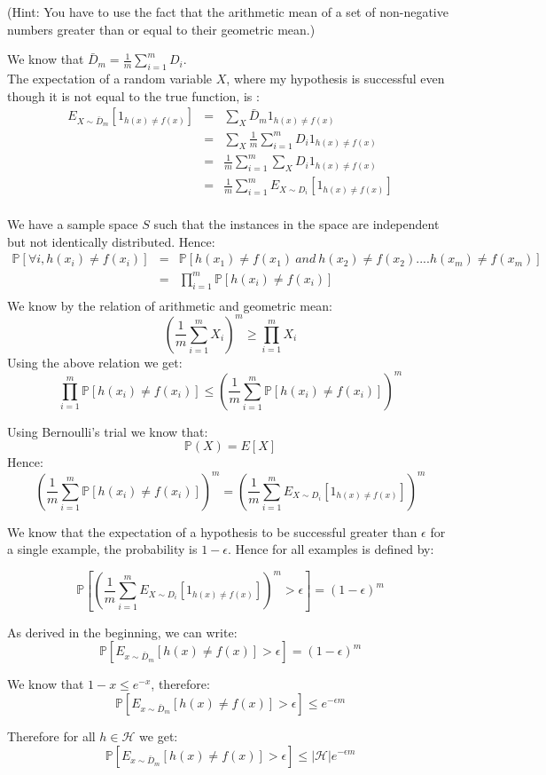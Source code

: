 \begin{enumerate}
  (Hint: You have to use the fact that the arithmetic mean of a set of
  non-negative numbers greater than or equal to their geometric mean.)
\begin{solution}
We know that $\bar{D}_m = \frac{1}{m}\sum_{i=1}^m D_i$. \\
The expectation of a random variable $X$, where my hypothesis is successful even though it is not equal to the true function, is :
\begin{eqnarray*}
E_{X \sim \bar{D}_m}[1_{h(x) \neq f(x)}] &=& \sum_{X}  \bar{D}_m  1_{h(x) \neq f(x)} \\
&=& \sum_{X} \frac{1}{m} \sum_{i=1}^m D_i 1_{h(x) \neq f(x)}\\
&=&  \frac{1}{m} \sum_{i=1}^m \sum_{X} D_i 1_{h(x) \neq f(x)}\\
&=& \frac{1}{m} \sum_{i=1}^m E_{X\sim D_i} [1_{h(x) \neq f(x)}]\\
\end{eqnarray*}

We have a sample space $S$ such that the instances in the space are independent but not identically distributed. Hence:
\begin{eqnarray*}
\mathbb{P}[\forall i, h(x_i) \neq f(x_i)] &=& \mathbb{P}[h(x_1) \neq f(x_1)\ and\ h(x_2) \neq f(x_2) .... h(x_m) \neq f(x_m)]\\
&=& \prod_{i=1}^m \mathbb{P}[h(x_i) \neq f(x_i)]\\
\end{eqnarray*}
We know by the relation of arithmetic and geometric mean:
\[\left(\frac{1}{m}\sum_{i=1}^m X_i\right)^m \geq \prod_{i=1}^m X_i\]
Using the above relation we get:
\[\prod_{i=1}^m \mathbb{P}[h(x_i) \neq f(x_i)] \leq \left(\frac{1}{m}\sum_{i=1}^m \mathbb{P}[h(x_i) \neq f(x_i)]\right)^m\]

Using Bernoulli's trial we know that:
\[\mathbb{P}(X) = E[X]\]
Hence:
\[\left(\frac{1}{m}\sum_{i=1}^m \mathbb{P}[h(x_i) \neq f(x_i)]\right)^m = \left(\frac{1}{m} \sum_{i=1}^m E_{X\sim D_i} [1_{h(x) \neq f(x)}]\right)^m\] 

We know that the expectation of a hypothesis to be successful greater than $\epsilon$ for a single example, the probability is $ 1 - \epsilon$. Hence for all examples is defined by:

\[\mathbb{P}\left[\left(\frac{1}{m} \sum_{i=1}^m E_{X\sim D_i} [1_{h(x) \neq f(x)}]\right)^m > \epsilon\right] = (1-\epsilon)^m\]

As derived in the beginning, we can write:
\[\mathbb{P}\left[E_{x \sim \bar{D}_m}\left[h(x) \ne f(x)\right] > \epsilon\right] = (1-\epsilon)^m\]



We know that $1-x \leq e^{-x}$, therefore:
\[\mathbb{P}\left[E_{x \sim \bar{D}_m}\left[h(x) \ne f(x)\right] > \epsilon\right]  \leq e^{-\epsilon m}\]

Therefore for all $h \in \mathcal{H}$ we get:
\[\mathbb{P}\left[E_{x \sim \bar{D}_m}\left[h(x) \ne f(x)\right]> \epsilon\right]  \leq |\mathcal{H}|e^{-\epsilon m}\]
\end{solution}
\end{enumerate}

